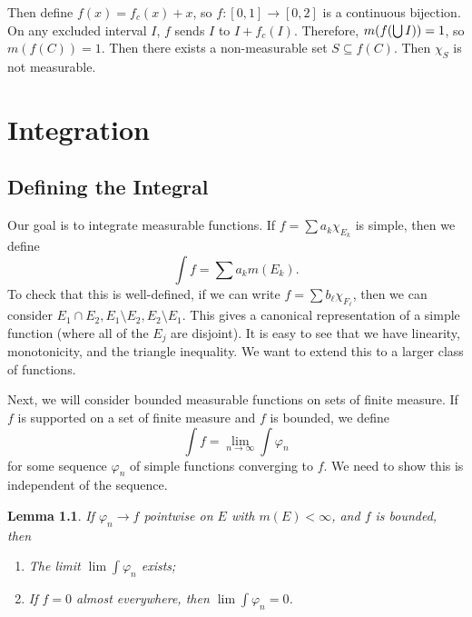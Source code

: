 \documentclass[leqno, openany]{memoir}
\newtheorem{lem}[thm]{Lemma}
\theoremstyle{definition}
\theoremstyle{remark}
\theoremstyle{plain}
\theoremstyle{definition}
\theoremstyle{remark}
\begin{document}
Then define $f(x) = f_c(x) + x$, so $f: [0,1] \to [0,2]$ is a continuous bijection. On any excluded interval $I$, $f$ sends $I$ to $I + f_c(I)$. Therefore, $m\qty(f\qty(\bigcup I)) = 1$, so $m(f(C)) = 1$. Then there exists a non-measurable set $S \subseteq f(C)$. Then $\chi_S$ is not measurable.

\chapter{Integration}%
\label{cha:integration}

\section{Defining the Integral}%
\label{sec:defining_the_integral}

Our goal is to integrate measurable functions. If $f = \sum a_k \chi_{E_k}$ is simple, then we define
\[ \int f = \sum a_k m(E_k). \]
To check that this is well-defined, if we can write $f = \sum b_{\ell} \chi_{F_{\ell}}$, then we can consider $E_1 \cap E_2, E_1 \setminus E_2, E_2 \setminus E_1$. This gives a canonical representation of a simple function (where all of the $E_j$ are disjoint).
It is easy to see that we have linearity, monotonicity, and the triangle inequality. We want to extend this to a larger class of functions.

Next, we will consider bounded measurable functions on sets of finite measure. If $f$ is supported on a set of finite measure and $f$ is bounded, we define
\[ \int f = \lim_{n \to \infty} \int \varphi_n \]
for some sequence $\varphi_n$ of simple functions converging to $f$. We need to show this is independent of the sequence.

\begin{lem}
    If $\varphi_n \to f$ pointwise on $E$ with $m(E) < \infty$, and $f$ is bounded, then
    \begin{enumerate}
        \item The limit $\lim \int \varphi_n$ exists;
        \item If $f = 0$ almost everywhere, then $\lim \int \varphi_n = 0$.
    \end{enumerate}
\end{lem}
\end{document}
